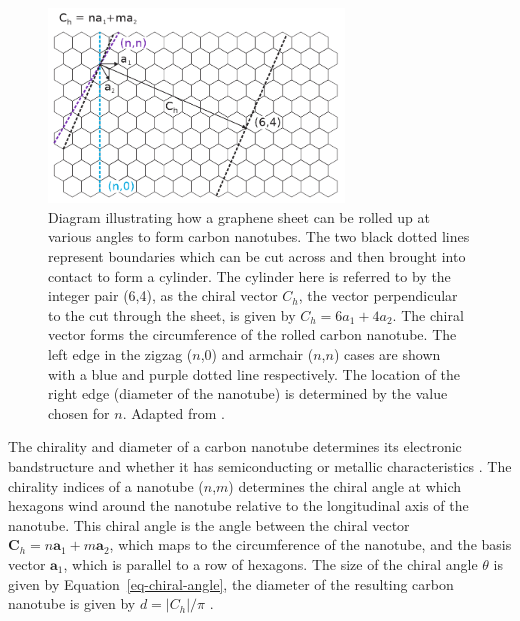 \documentclass[
  a4paper,
]{scrbook}
\begin{document}
\begin{figure}

{\centering \includegraphics[width=0.7\textwidth,height=\textheight]{figures/ch2/carbon_nanotube_wrapping.png}

}

\caption{\label{fig-carbon-nanotube-wrapping}Diagram illustrating how a
graphene sheet can be rolled up at various angles to form carbon
nanotubes. The two black dotted lines represent boundaries which can be
cut across and then brought into contact to form a cylinder. The
cylinder here is referred to by the integer pair (6,4), as the chiral
vector \(C_h\), the vector perpendicular to the cut through the sheet,
is given by \(C_h = 6a_1+4a_2\). The chiral vector forms the
circumference of the rolled carbon nanotube. The left edge in the zigzag
(\(n\),0) and armchair (\(n\),\(n\)) cases are shown with a blue and
purple dotted line respectively. The location of the right edge
(diameter of the nanotube) is determined by the value chosen for \(n\).
Adapted from \autocite{Dekker1999,Lu2012}.}

\end{figure}

The chirality and diameter of a carbon nanotube determines its
electronic bandstructure and whether it has semiconducting or metallic
characteristics
\autocite{Martel1998,Dekker1999,McEuen2002,Avouris2007,Shkodra2021,Li2023}.
The chirality indices of a nanotube (\(n\),\(m\)) determines the chiral
angle at which hexagons wind around the nanotube relative to the
longitudinal axis of the nanotube. This chiral angle is the angle
between the chiral vector
\(\textbf{C}_h = n\textbf{a}_1+m\textbf{a}_2\), which maps to the
circumference of the nanotube, and the basis vector \(\textbf{a}_1\),
which is parallel to a row of hexagons. The size of the chiral angle
\(\theta\) is given by Equation~\ref{eq-chiral-angle}, the diameter of
the resulting carbon nanotube is given by \(d=|C_h|/\pi\)
\autocite{Lu2012}.
\end{document}
